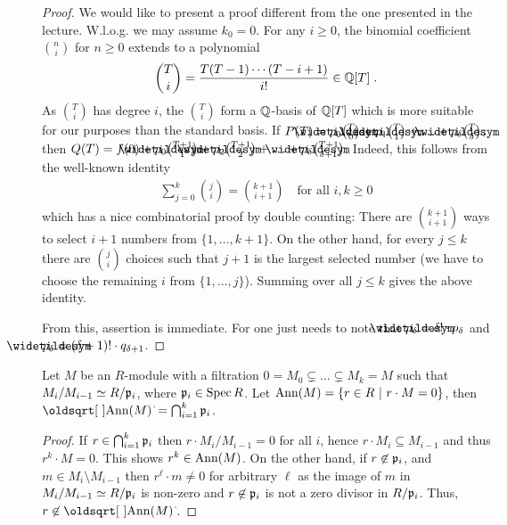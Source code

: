 \documentclass[a4paper,parskip=half,numbers=enddot, DIV=12, headheight=30pt]{scrreprt}
\begin{document}
\begin{proof}
	We would like to present a proof different from the one presented in the lecture. W.l.o.g. we may assume $k_0=0$. For any $i\geq0$, the binomial coefficient $\binom{n}{i}$ for $n\geq0$ extends to a polynomial 
	\begin{align*}
		\binom{T}{i}=\frac{T(T-1)\cdots(T-i+1)}{i!}\in\mathbb{Q}[T]\;.
	\end{align*}
	As $\binom{T}{i}$ has degree $i$, the $\binom{T}{i}$ form a $\mathbb{Q}$-basis of $\mathbb{Q}[T]$ which is more suitable for our purposes than the standard basis. If $P(T)=\snake p_0\binom{T}{0}+\snake p_1\binom{T}{1}+\ldots+\snake p_\delta \binom{T}{\delta}$, then $Q(T)=f(0)+\snake p_0\binom{T+1}{1}+\snake p_2\binom{T+1}{2}+\ldots+\snake p_\delta\binom{T+1}{\delta+1}$. Indeed, this follows from the well-known identity
	\begin{align*}
		\sum_{j=0}^{k}\binom{j}{i}=\binom{k+1}{i+1}\quad\text{for all }i,k\geq 0
	\end{align*}
	which has a nice combinatorial proof by double counting: There are $\binom{k+1}{i+1}$ ways to select $i+1$ numbers from $\{1,\ldots,k+1\}$. On the other hand, for every $j\leq k$ there are $\binom{j}{i}$ choices such that $j+1$ is the largest selected number (we have to choose the remaining $i$ from $\{1,\ldots,j\}$). Summing over all $j\leq k$ gives the above identity.
	
	From this, assertion  is immediate. For  one just needs to note that $\snake p_\delta=\delta!\cdot p_\delta$ and $\snake p_\delta=(\delta+1)!\cdot q_{\delta+1}$.
\end{proof}
\begin{fact}
    Let $M$ be an $R$-module with a filtration $0=M_0\subsetneq \ldots \subsetneq M_k=M$ such that $M_i/M_{i-1}\simeq R/\mathfrak{p}_i$, where $\mathfrak{p}_i \in \operatorname{Spec} R$. Let $\operatorname{Ann}(M) = \left\{r\in R\ \middle|\  r\cdot M = 0\right\}$, then $\sqrt{\Ann(M)} = \bigcap_{i=1}^k\pp_i$.
\end{fact}
\begin{proof}
    If $r\in \bigcap_{i=1}^k\mathfrak{p}_i$ then $r\cdot M_i/M_{i-1} = 0$ for all $i$, hence $r\cdot M_i\subseteq M_{i-1}$ and thus $r^k\cdot M =0$. This shows $r^k\in \operatorname{Ann}(M)$. On the other hand, if $r\not\in \mathfrak{p}_i$, and $m\in M_i\setminus M_{i-1}$ then $r^\ell\cdot m \neq 0$ for arbitrary $\ell$ as the image of $m$ in $M_i/M_{i-1} \simeq R/\mathfrak{p}_i$ is non-zero and $r\not\in \mathfrak{p}_i$ is not a zero divisor in $R/\mathfrak{p}_i$. Thus, $r\not\in \sqrt{\Ann(M)}$.
\end{proof}
\end{document}
